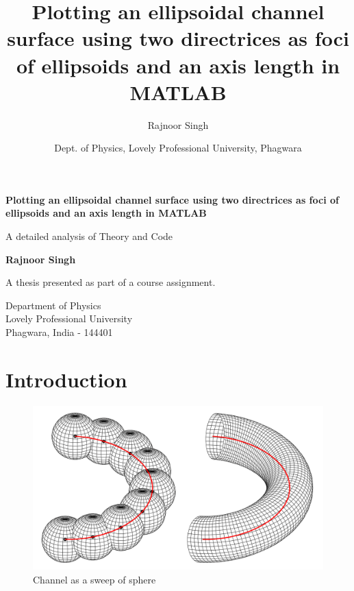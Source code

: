 \documentclass[a4paper]{article}
\title{Plotting an ellipsoidal channel surface using two directrices as
foci of ellipsoids and an axis length in MATLAB}
\author{Rajnoor Singh}
\date{Dept. of Physics, Lovely Professional University, Phagwara}
\begin{document}
\begin{titlepage}
   \begin{center}
       \vspace*{1.5cm}

      {\Large \textbf{Plotting an ellipsoidal channel surface using two directrices as
foci of ellipsoids and an axis length in MATLAB}}

       \vspace{0.5cm}
        {\large A detailed analysis of Theory and Code}
            
       \vspace{1.5cm}

       \textbf{Rajnoor Singh}

       \vfill
            
      A thesis presented as part of a course assignment.
            
       \vspace{0.8cm}
     

            
       Department of Physics\\
       Lovely Professional University\\
       Phagwara, India - 144401\\
    
            
   \end{center}
\end{titlepage}

\newpage
\hypertarget{introduction}{%
\section{Introduction}\label{introduction}}

\begin{figure}[h]
    \centering
    \includegraphics[width=0.7\linewidth]{Images/Channel_Construction.png}
    \caption{Channel as a sweep of sphere}
    \label{fig:enter-label}
\end{figure}
\end{document}
